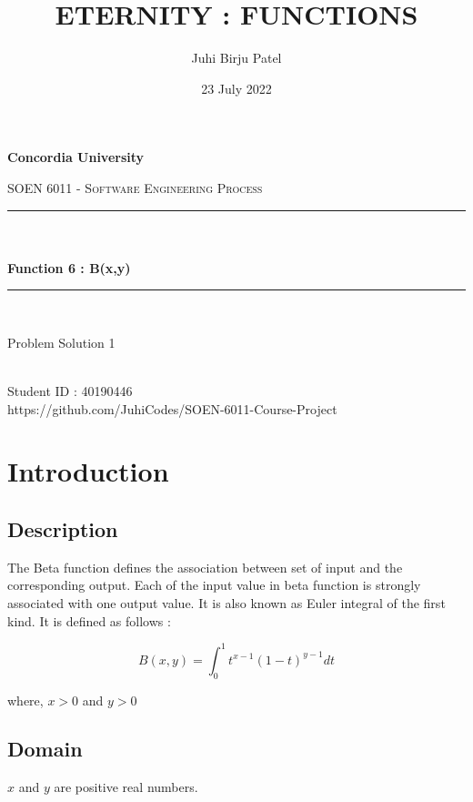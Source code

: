 \documentclass[12pt]{report}
\title{ETERNITY : FUNCTIONS}
\author{Juhi Birju Patel}
\date{23 July 2022}
\makeatletter
\let\thetitle\@title
\let\theauthor\@author
\makeatother
\begin{document}
\begin{titlepage}
	\centering
    \vspace*{0.5 cm}
\begin{center}    \textbf{\Large Concordia University}\\[2.0 cm]	\end{center}
	\textsc{\Large  SOEN 6011 - Software Engineering Process }\\[0.5 cm]
	\rule{\linewidth}{0.2 mm} \\[0.4 cm]
	{ \huge \textbf \thetitle}\\[0.2 cm]
	{ \huge \textbf{ Function 6 : B(x,y)}}
	\rule{\linewidth}{0.2 mm} \\[1.5 cm]

\begin{center}   {\Large Problem Solution 1}\\[2.0 cm]
\end{center}	
\begin{center}   {\Large \textbf{\theauthor}} \\[0.2 cm]
                 {\large Student ID : 40190446 }\\[0.2 cm]
                 {\large https://github.com/JuhiCodes/SOEN-6011-Course-Project}
\end{center}
	
\end{titlepage}

\tableofcontents
\pagebreak

\renewcommand{\thesection}{\arabic{section}}
\section{Introduction}
\subsection{Description}
The Beta function defines the association between set of input and the corresponding output. Each of the input value in beta function is strongly associated with one output value. It is also known as Euler integral of the first kind. It is defined as follows :

$$ B(x,y) = \int_{0}^{1} t^{x-1}(1-t)^{y-1}dt  $$ 

where, $ x > 0 $ and $ y > 0 $

\subsection{Domain}
$x$ and $y$ are positive real numbers.
\end{document}
